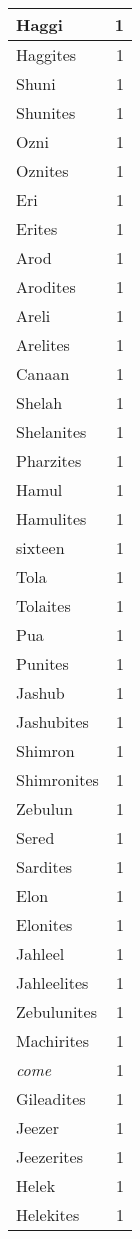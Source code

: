 \begin{center}
\begin{longtable}{l|r}
Haggi & 1\\ \hline 
Haggites & 1\\ \hline 
Shuni & 1\\ \hline 
Shunites & 1\\ \hline 
Ozni & 1\\ \hline 
Oznites & 1\\ \hline 
Eri & 1\\ \hline 
Erites & 1\\ \hline 
Arod & 1\\ \hline 
Arodites & 1\\ \hline 
Areli & 1\\ \hline 
Arelites & 1\\ \hline 
Canaan & 1\\ \hline 
Shelah & 1\\ \hline 
Shelanites & 1\\ \hline 
Pharzites & 1\\ \hline 
Hamul & 1\\ \hline 
Hamulites & 1\\ \hline 
sixteen & 1\\ \hline 
Tola & 1\\ \hline 
Tolaites & 1\\ \hline 
Pua & 1\\ \hline 
Punites & 1\\ \hline 
Jashub & 1\\ \hline 
Jashubites & 1\\ \hline 
Shimron & 1\\ \hline 
Shimronites & 1\\ \hline 
Zebulun & 1\\ \hline 
Sered & 1\\ \hline 
Sardites & 1\\ \hline 
Elon & 1\\ \hline 
Elonites & 1\\ \hline 
Jahleel & 1\\ \hline 
Jahleelites & 1\\ \hline 
Zebulunites & 1\\ \hline 
Machirites & 1\\ \hline 
\emph{come} & 1\\ \hline 
Gileadites & 1\\ \hline 
Jeezer & 1\\ \hline 
Jeezerites & 1\\ \hline 
Helek & 1\\ \hline 
Helekites & 1\\ \hline 

\end{longtable}
\end{center}
